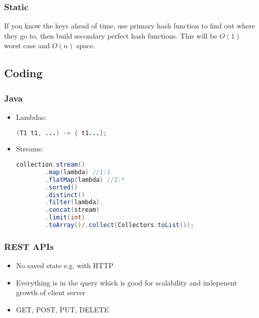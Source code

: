 \documentclass{article}
\begin{document}
\subsubsection{Static}
If you know the keys ahead of time, use primary hash function to find out where they go to, then build secondary perfect hash functions. This will be $O(1)$ worst case and $O(n)$ space.

\subsection{Coding}
\subsubsection{Java}
\begin{itemize}
    \item Lambdas:
    \begin{lstlisting}[language=java]
    (T1 t1, ...) -> { t1...};
    \end{lstlisting}
    \item Streams:
    \begin{lstlisting}[language=java]
    collection.stream()
        .map(lambda) //1:1
        .flatMap(lambda) //1:*
        .sorted()
        .distinct()
        .filter(lambda).
        .concat(stream)
        .limit(int)
        .toArray()/.collect(Collectors.toList());
    \end{lstlisting}
\end{itemize}

\subsubsection{REST APIs}
\begin{itemize}
    \item No saved state e.g. with HTTP
    \item Everything is in the query which is good for scalability and indepenent growth of client server
    \item GET, POST, PUT, DELETE
\end{itemize}
\end{document}
